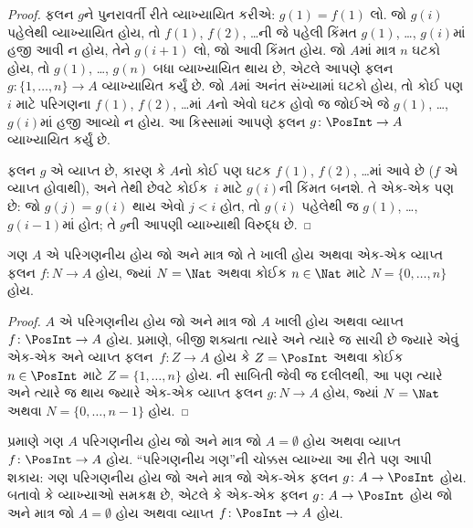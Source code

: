 \begin{proof}
ફલન $g$ને પુનરાવર્તી રીતે વ્યાખ્યાયિત કરીએ:
$g(1) = f(1)$ લો. જો $g(i)$ પહેલેથી વ્યાખ્યાયિત હોય,
તો $f(1)$, $f(2)$, \dots{}ની જે પહેલી કિંમત
$g(1)$, \dots, $g(i)$માં હજી આવી ન હોય,
તેને $g(i+1)$ લો, જો આવી કિંમત હોય.
જો $A$માં માત્ર $n$ ઘટકો હોય, તો
$g(1)$, \dots, $g(n)$ બધા વ્યાખ્યાયિત થાય છે,
એટલે આપણે ફલન $g\colon \{1, \dots, n\}
\to A$ વ્યાખ્યાયિત કર્યું છે. જો $A$માં અનંત
સંખ્યામાં ઘટકો હોય, તો કોઈ પણ $i$ માટે
પરિગણના $f(1)$, $f(2)$, \dots{}માં $A$નો એવો
ઘટક હોવો જ જોઈએ જે $g(1)$, \dots, $g(i)$માં
હજી આવ્યો ન હોય. આ કિસ્સામાં આપણે ફલન
$g\colon \PosInt \to A$ વ્યાખ્યાયિત કર્યું છે.

ફલન $g$ એ વ્યાપ્ત છે, કારણ કે $A$નો
કોઈ પણ ઘટક $f(1)$, $f(2)$, \dots{}માં આવે છે
($f$ એ વ્યાપ્ત હોવાથી), અને તેથી છેવટે
કોઈક~$i$ માટે $g(i)$ની કિંમત બનશે.
તે એક-એક પણ છે: જો $g(j) = g(i)$ થાય
એવો $j < i$ હોત, તો $g(i)$ પહેલેથી જ
$g(1)$, \dots, $g(i-1)$માં હોત; તે $g$ની
આપણી વ્યાખ્યાથી વિરુદ્ધ છે.
\end{proof}

\begin{cor}
ગણ $A$ એ પરિગણનીય હોય જો અને માત્ર જો
તે ખાલી હોય અથવા એક-એક વ્યાપ્ત ફલન
$f\colon N \to A$ હોય, જ્યાં $N = \Nat$
અથવા કોઈક $n \in \Nat$ માટે $N = \{0, \dots, n\}$ હોય.
\end{cor}

\begin{proof}
$A$ એ પરિગણનીય હોય જો અને માત્ર જો $A$
ખાલી હોય અથવા વ્યાપ્ત $f\colon \PosInt \to A$
હોય.  પ્રમાણે, બીજી શક્યતા
ત્યારે અને ત્યારે જ સાચી છે જ્યારે એવું એક-એક અને વ્યાપ્ત
ફલન~$f\colon Z \to A$ હોય કે $Z =
\PosInt$ અથવા કોઈક $n \in \PosInt$ માટે
$Z = \{1, \dots, n\}$ હોય.
ની સાબિતી જેવી જ દલીલથી,
આ પણ ત્યારે અને ત્યારે જ થાય જ્યારે
એક-એક વ્યાપ્ત ફલન $g\colon N \to A$ હોય, જ્યાં
$N = \Nat$ અથવા $N = \{0, \dots, n-1\}$ હોય.
\end{proof}

\begin{prob}
 પ્રમાણે ગણ $A$
પરિગણનીય હોય જો અને માત્ર જો $A = \emptyset$
હોય અથવા વ્યાપ્ત $f\colon
\PosInt \to A$ હોય. “પરિગણનીય ગણ”ની ચોક્કસ
વ્યાખ્યા આ રીતે પણ આપી શકાય: ગણ પરિગણનીય હોય
જો અને માત્ર જો એક-એક ફલન
$g\colon A \to \PosInt$ હોય.
બતાવો કે વ્યાખ્યાઓ સમકક્ષ છે, એટલે કે
એક-એક ફલન $g\colon A \to \PosInt$
હોય જો અને માત્ર જો $A = \emptyset$ હોય અથવા
વ્યાપ્ત $f\colon \PosInt \to A$ હોય.
\end{prob}
\endgroup


